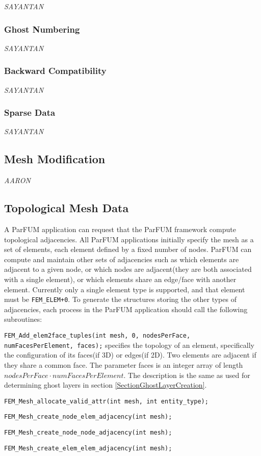 {\it SAYANTAN}

\subsubsection{Ghost Numbering}

{\it SAYANTAN}

\subsubsection{Backward Compatibility}

{\it SAYANTAN}

\subsubsection{Sparse Data}

{\it SAYANTAN}

\subsection{Mesh Modification}

{\it AARON}

\subsection{Topological Mesh Data}

A ParFUM application can request that the ParFUM framework compute topological adjacencies. All ParFUM applications initially specify the mesh as a set of elements, each element defined by a fixed number of nodes. ParFUM can compute and maintain other sets of adjacencies such as which elements are adjacent to a given node, or which nodes are adjacent(they are both associated with a single element), or which elements share an edge/face with another element. Currently only a single element type is supported, and that element must be \texttt{FEM\_ELEM+0}. To generate the structures storing the other types of adjacencies, each process in the ParFUM application should call the following subroutines:

\begin{list}{-}{}
\item \texttt{FEM\_Add\_elem2face\_tuples(int mesh, 0, nodesPerFace, numFacesPerElement, faces);} specifies the topology of an element, specifically the configuration of its faces(if 3D) or edges(if 2D). Two elements are adjacent if they share a common face. The parameter faces is an integer array of length $nodesPerFace \cdot numFacesPerElement$. The description is the same as used for determining ghost layers in section \ref{SectionGhostLayerCreation}.
\item \texttt{FEM\_Mesh\_allocate\_valid\_attr(int mesh, int entity\_type);}
\item \texttt{FEM\_Mesh\_create\_node\_elem\_adjacency(int mesh);}
\item \texttt{FEM\_Mesh\_create\_node\_node\_adjacency(int mesh);}
\item \texttt{FEM\_Mesh\_create\_elem\_elem\_adjacency(int mesh);}
\end{list}

